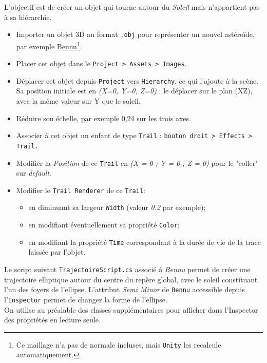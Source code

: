 \documentclass[a4paper,10pt]{article}
\newenvironment{solution}%
{\begin{tcolorbox}[breakable,colback=red!5!white,colframe=red!75!black,title=Solution]}%
{\end{tcolorbox}}
\begin{document}
\ifversionenseignant
\begin{solution}
L'objectif est de créer un objet qui tourne autour du \textit{Soleil} mais n'appartient pas à sa hiérarchie.

\begin{itemize}
	\item Importer un objet 3D au format \texttt{.obj} pour représenter un nouvel astéroïde, par exemple \href{https://nasa3d.arc.nasa.gov/detail/bennu}{Bennu}\footnote{Ce maillage n'a pas de normale incluses, mais \texttt{Unity} les recalcule automatiquement.}.
	\item Placer cet objet dans le \texttt{Project > Assets > Images}.
	\item Déplacer cet objet depuis \texttt{Project} vers \texttt{Hierarchy}, ce qui l'ajoute à la scène. Sa position initiale est en \textit{(X=0, Y=0, Z=0)} : le déplacer sur le plan (XZ), avec la même valeur sur Y que le soleil.
	\item Réduire son échelle, par exemple 0,24 sur les trois axes.
	\item Associer à cet objet  un enfant de type \texttt{Trail} : \texttt{bouton droit > Effects > Trail.} 
	\item Modifier la \textit{Position} de ce \texttt{Trail} en \textit{(X = 0 ; Y = 0 ; Z = 0)} pour le "coller" sur \textit{default}.
	\item Modifier le \texttt{Trail Renderer} de ce \texttt{Trail}:
	\begin{itemize}
		\item en diminuant sa largeur \texttt{Width} (valeur \textit{0.2} par exemple);
		\item en modifiant éventuellement sa propriété \texttt{Color};
		\item en modifiant la propriété \texttt{Time} correspondant à la durée de vie de la trace laissée par l'objet.
	\end{itemize}
\end{itemize}

Le script suivant \texttt{TrajectoireScript.cs} associé à \textit{Bennu} permet de créer une trajectoire elliptique autour du centre du repère global, avec le soleil constituant l'un des foyers de l'ellipse. L'attribut \textit{Semi Minor}  de \texttt{Bennu} accessible depuis l'\texttt{Inspector} permet de changer la forme de l'ellipse. \\

On utilise au préalable des classes supplémentaires pour afficher dans l'Inspector des propriétés en lecture seule.


\end{solution}
\end{document}
